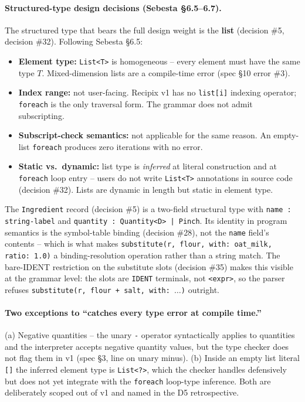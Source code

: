 \documentclass[11pt,a4paper]{article}
\begin{document}
\paragraph{Structured-type design decisions (Sebesta \S6.5--6.7).}
The structured type that bears the full design weight is the
\textbf{list} (decision \#5, decision \#32). Following Sebesta \S6.5:
\begin{itemize}[leftmargin=*,itemsep=2pt]
  \item \textbf{Element type:} \texttt{List<T>} is homogeneous -- every
        element must have the same type $T$. Mixed-dimension lists are a
        compile-time error (spec \S10 error \#3).
  \item \textbf{Index range:} not user-facing. Recipix v1 has no
        \texttt{list[i]} indexing operator; \texttt{foreach} is the only
        traversal form. The grammar does not admit subscripting.
  \item \textbf{Subscript-check semantics:} not applicable for the same
        reason. An empty-list \texttt{foreach} produces zero iterations
        with no error.
  \item \textbf{Static vs.\ dynamic:} list type is \emph{inferred} at
        literal construction and at \texttt{foreach} loop entry --
        users do not write \texttt{List<T>} annotations in source code
        (decision \#32). Lists are dynamic in length but static in
        element type.
\end{itemize}

\noindent The \texttt{Ingredient} record (decision \#5) is a two-field
structural type with \texttt{name : string-label} and
\texttt{quantity : Quantity<D> | Pinch}. Its identity in program semantics
is the symbol-table binding (decision \#28), not the \texttt{name} field's
contents -- which is what makes \texttt{substitute(r, flour, with: oat\_milk,
ratio: 1.0)} a binding-resolution operation rather than a string
match. The bare-IDENT restriction on the substitute slots (decision
\#35) makes this visible at the grammar level: the slots are
\texttt{IDENT} terminals, not \texttt{<expr>}, so the parser refuses
\texttt{substitute(r, flour + salt, with: $\dots$)} outright.

\paragraph{Two exceptions to ``catches every type error at compile
time.''} (a) Negative quantities -- the unary \texttt{-} operator
syntactically applies to quantities and the interpreter accepts negative
quantity values, but the type checker does not flag them in v1
(spec \S3, line on unary minus). (b) Inside an empty list literal
\texttt{[]} the inferred element type is \texttt{List<?>}, which the
checker handles defensively but does not yet integrate with the
\texttt{foreach} loop-type inference. Both are deliberately scoped out
of v1 and named in the D5 retrospective.
\end{document}

